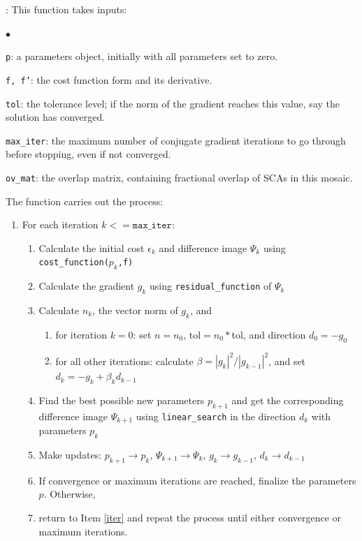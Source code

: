\documentclass[]{pasj01}
\begin{document}
\vskip 0.1in

:
This function takes inputs: 
\begin{list}{$\bullet$}{}
    \item {\tt p}: a parameters object, initially with all parameters set to zero.
    \item {\tt f, f'}: the cost function form and its derivative.
    \item {\tt tol}: the tolerance level; if the norm of the gradient reaches this value, say the solution has converged.
    \item {\tt max\_iter}: the maximum number of conjugate gradient iterations to go through before stopping, even if not converged.
    \item {\tt ov\_mat}: the overlap matrix, containing fractional overlap of SCAs in this mosaic.
\end{list}
The function carries out the process:
\begin{enumerate}
\item For each iteration $k<=\texttt{max\_iter}$:
\begin{enumerate}
    \item Calculate the initial cost $\epsilon_k$ and difference image $\Psi_k$ using {\tt cost\_function($p_k$,f)}
    \item\label{iter} Calculate the gradient $g_k$ using {\tt residual\_function} of $\Psi_k$
    \item Calculate $n_k$, the vector norm of $g_k$, and 
    \begin{enumerate}
        \item for iteration $k=0$: set $n=n_0$, tol$=n_0*$tol, and direction $d_0=-g_0$
        \item for all other iterations: calculate $\beta=|g_k|^2/|g_{k-1}|^2$, and set $d_k=-g_k+\beta_k d_{k-1}$
    \end{enumerate}
    \item Find the best possible new parameters $p_{k+1}$ and get the corresponding difference image $\Psi_{k+1}$ using {\tt linear\_search} in the direction $d_k$ with parameters $p_k$
    \item Make updates: $p_{k+1}\to p_k$, $\Psi_{k+1}\to\Psi_k$, $g_k\to g_{k-1}$, $d_k\to d_{k-1}$
    \item If convergence or maximum iterations are reached, finalize the parameters $p$. Otherwise,
    \item return to Item \ref{iter} and repeat the process until either convergence or maximum iterations.
\end{enumerate}
\end{enumerate}
\end{document}
